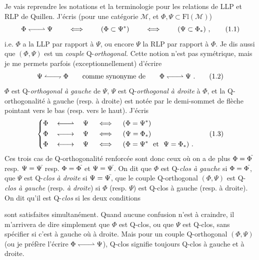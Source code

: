 Je vais reprendre les notations et la terminologie pour les relations de LLP et RLP de Quillen. J'écris (pour une catégorie $\mathcal{M}$, et $\Phi, \Psi \subset \mathrm{Fl}(\mathcal{M})$)
\[
\Phi \Qo \Psi \qquad \iff \qquad (\Phi \subset \Psi^{*}) \qquad \iff \qquad (\Psi \subset \Phi_{*})\ ,
\tag*{(1.1)}
\]
i.e. $\Phi$ a la LLP par rapport à $\Psi$, ou encore $\Psi$ la RLP par rapport à $\Phi$. Je dis aussi que $(\Phi, \Psi)$ est un \textit{couple} Q-\textit{orthogonal.} Cette notion n'est pas symétrique, mais je me permets parfois (exceptionnellement) d'écrire
\[
\Psi \Qorev \Phi \qquad \text{comme synonyme de} \qquad \Phi \Qo \Psi\ .
\tag*{(1.2)}
\]
$\Phi$ est Q-\textit{orthogonal à gauche} de $\Psi$, $\Psi$ est Q-\textit{orthogonal à droite} à $\Phi$, et la Q-orthogonalité à gauche (resp. à droite) est notée par le demi-sommet de flèche pointant vers le bas (resp. vers le haut). J'écris
\[
\left\{
\begin{aligned}
&\Phi \quad \Qog \quad \Psi \quad \iff \quad (\Phi = \Psi^{*})\\
&\Phi \quad \Qod \quad \Psi \quad \iff \quad (\Psi = \Phi_{*})\\
&\Phi \quad \Qogd \quad \Psi \quad \iff \quad (\Phi = \Psi^{*} \ \text{ et } \ \Psi = \Phi_{*})\ .
\end{aligned}
\right.
\tag*{(1.3)}
\]
Ces trois cas de Q-orthogonalité renforcée sont donc ceux où on a de plus $\Phi = \Phi^{\tilde{}}$
resp. $\Psi = \Psi^{\bar{}}$ resp. $\Phi = \Phi^{\tilde{}}$ et $\Psi = \Psi^{\bar{}}$. On dit que $\Phi$ est Q-\textit{clos à gauche} si $\Phi = \Phi^{\tilde{}}$, que %
$\Psi$ est Q-\textit{clos à droite} si $\Psi = \Psi^{\bar{}}$, que le couple Q-orthogonal $(\Phi, \Psi)$ est Q-\textit{clos à gauche} (resp. \textit{à droite}) si $\Phi$ (resp. $\Psi$) est Q-clos à gauche (resp. à droite). On dit qu'il est Q-\textit{clos} si les deux conditions %


sont satisfaites simultanément. Quand aucune confusion n'est à craindre, il m'arrivera de dire simplement que $\Phi$ est Q-clos, ou que $\Psi$ est Q-clos, sans spécifier si c'est à gauche où %
à droite. Mais pour un couple Q-orthogonal $(\Phi, \Psi)$ (ou je préfère l'écrire $\Phi \Qo \Psi$), Q-clos %
signifie toujours Q-clos à gauche et à droite.

